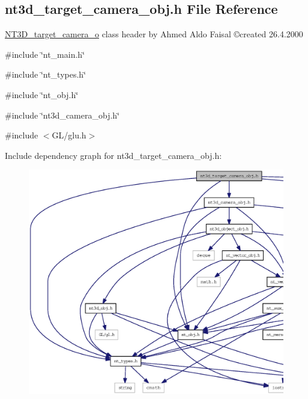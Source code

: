 \subsection{nt3d\_\-target\_\-camera\_\-obj.h File Reference}
\label{nt3d__target__camera__obj_8h}



\begin{DoxyItemize}
\item \hyperlink{class_n_t3_d__target__camera__o}{NT3D\_\-target\_\-camera\_\-o} class header by Ahmed Aldo Faisal \copyright created 26.4.2000 
\end{DoxyItemize} 


{\ttfamily \#include \char`\"{}nt\_\-main.h\char`\"{}}\par
{\ttfamily \#include \char`\"{}nt\_\-types.h\char`\"{}}\par
{\ttfamily \#include \char`\"{}nt\_\-obj.h\char`\"{}}\par
{\ttfamily \#include \char`\"{}nt3d\_\-camera\_\-obj.h\char`\"{}}\par
{\ttfamily \#include $<$GL/glu.h$>$}\par
Include dependency graph for nt3d\_\-target\_\-camera\_\-obj.h:
\nopagebreak
\begin{figure}[H]
\begin{center}
\leavevmode
\includegraphics[width=400pt]{nt3d__target__camera__obj_8h__incl}
\end{center}
\end{figure}
